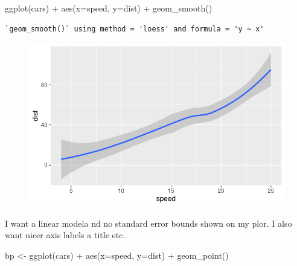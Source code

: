 \documentclass[
  letterpaper,
  DIV=11,
  numbers=noendperiod]{scrartcl}
\newenvironment{Shaded}{\begin{snugshade}}{\end{snugshade}}
\newcommand{\AttributeTok}[1]{\textcolor[rgb]{0.40,0.45,0.13}{#1}}
\newcommand{\FunctionTok}[1]{\textcolor[rgb]{0.28,0.35,0.67}{#1}}
\newcommand{\NormalTok}[1]{\textcolor[rgb]{0.00,0.23,0.31}{#1}}
\newcommand{\OtherTok}[1]{\textcolor[rgb]{0.00,0.23,0.31}{#1}}
\newcommand{\SpecialCharTok}[1]{\textcolor[rgb]{0.37,0.37,0.37}{#1}}
\begin{document}
\begin{Shaded}
\begin{Highlighting}[]
\FunctionTok{ggplot}\NormalTok{(cars) }\SpecialCharTok{+} \FunctionTok{aes}\NormalTok{(}\AttributeTok{x=}\NormalTok{speed, }\AttributeTok{y=}\NormalTok{dist) }\SpecialCharTok{+} \FunctionTok{geom\_smooth}\NormalTok{()}
\end{Highlighting}
\end{Shaded}

\begin{verbatim}
`geom_smooth()` using method = 'loess' and formula = 'y ~ x'
\end{verbatim}

\begin{figure}[H]

{\centering \includegraphics{./-class05_files/figure-pdf/unnamed-chunk-5-1.pdf}

}

\end{figure}

I want a linear modela nd no standard error bounds shown on my plor. I
also want nicer axis labels a title etc.

\begin{Shaded}
\begin{Highlighting}[]
\NormalTok{bp }\OtherTok{\textless{}{-}} \FunctionTok{ggplot}\NormalTok{(cars) }\SpecialCharTok{+} \FunctionTok{aes}\NormalTok{(}\AttributeTok{x=}\NormalTok{speed, }\AttributeTok{y=}\NormalTok{dist) }\SpecialCharTok{+} \FunctionTok{geom\_point}\NormalTok{()}
\end{Highlighting}
\end{Shaded}
\end{document}
